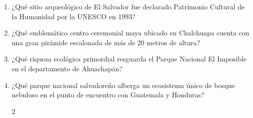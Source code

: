 \documentclass[10pt,a4paper]{article}
\begin{document}
\begin{enumerate}[label=\textbf{\arabic*.}]
\begin{enumerate}[label=\textbf{\Alph*)}]
\end{enumerate}
\vspace{0.15cm}
\item ¿Qué sitio arqueológico de El Salvador fue declarado Patrimonio Cultural de la Humanidad por la UNESCO en 1993?
\begin{enumerate}[label=\textbf{\Alph*)}]
\end{enumerate}
\vspace{0.15cm}
\item ¿Qué emblemático centro ceremonial maya ubicado en Chalchuapa cuenta con una gran pirámide escalonada de más de 20 metros de altura?
\begin{enumerate}[label=\textbf{\Alph*)}]
\end{enumerate}
\vspace{0.15cm}
\item ¿Qué riqueza ecológica primordial resguarda el Parque Nacional El Imposible en el departamento de Ahuachapán?
\begin{enumerate}[label=\textbf{\Alph*)}]
\end{enumerate}
\vspace{0.15cm}
\item ¿Qué parque nacional salvadoreño alberga un ecosistema único de bosque nebuloso en el punto de encuentro con Guatemala y Honduras?
\begin{enumerate}[label=\textbf{\Alph*)}]
\begin{multicols}{2}

\end{multicols}
\end{enumerate}
\end{enumerate}
\end{document}
